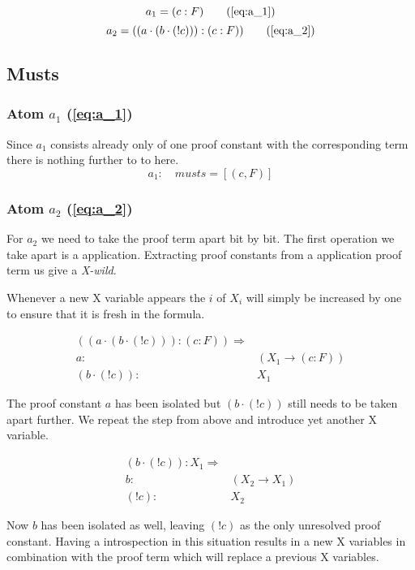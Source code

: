 \begin{equation*}
		a_1 = (c:F) 
		\tag{\ref{eq:a_1}}
\end{equation*}
\begin{equation*}		
		a_2 = ((a \cdot(b\cdot (! c))):(c:F)) 
		\tag{\ref{eq:a_2}}
\end{equation*}

\subsection{Musts}
\subsubsection[First atom]{Atom $a_1$ (\ref{eq:a_1})}
Since $a_1$ consists already only of one proof constant with the corresponding term there is nothing further to to here.
\begin{equation}
	a_1: \quad musts = [(c, F)]
\end{equation}

\subsubsection[Second atom]{Atom $a_2$ (\ref{eq:a_2})}
For $a_2$ we need to take the proof term apart bit by bit. The first operation we take apart is a application. Extracting proof constants from a application proof term us give a \emph{X-wild}. 

Whenever a new X variable appears the $i$ of $X_i$ will simply be increased by one to ensure that it is fresh in the formula.

\begin{align*}\label{eq:musts1_a_2}
		((a \cdot(b\cdot (! c))):(c:F)) \Rightarrow & \\
		 a : &(X_1 \rightarrow (c:F)) \\
		 (b\cdot(! c)): &X_1
\end{align*}

The proof constant $a$ has been isolated but $(b\cdot(! c))$ still needs to be taken apart further. We repeat the step from above and introduce yet another X variable.

\begin{align*}
	(b\cdot(! c)): X_1 \Rightarrow & \\
	b : & (X_2 \rightarrow X_1) \\
	(! c) : & X_2
\end{align*}

Now $b$ has been isolated as well, leaving $(! c)$ as the only unresolved proof constant. Having a introspection in this situation results in a new X variables in combination with the proof term which will replace a previous X variables.

